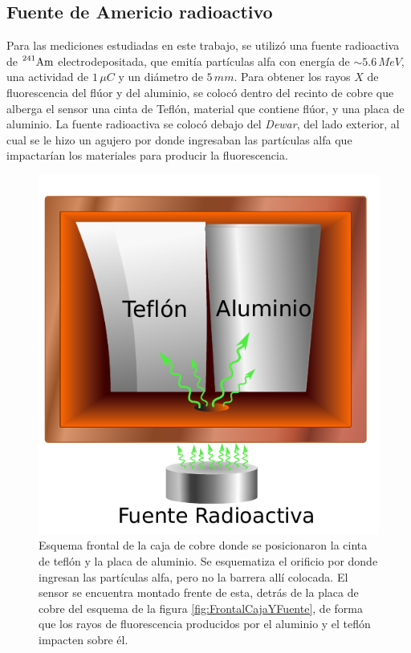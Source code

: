 \subsection{Fuente de Americio radioactivo}
\noindent Para las mediciones estudiadas en este trabajo, se utilizó una fuente radioactiva de $\prescript{241}{}{\mbox{Am}}$ electrodepositada, que emitía partículas alfa con energía de $\sim 5.6\,\si{MeV}$, una actividad de $1\,\si{\mu C}$ y un diámetro de $5\,\si{mm}$. Para obtener los rayos $X$ de fluorescencia del flúor y del aluminio, se colocó dentro del recinto de cobre que alberga el sensor una cinta de Teflón, material que contiene flúor, y una placa de aluminio. La fuente radioactiva se colocó debajo del \textit{Dewar}, del lado exterior, al cual se le hizo un agujero por donde ingresaban las partículas alfa que impactarían los materiales para producir la fluorescencia.
\begin{figure}%
    \centering
    \includegraphics[scale=0.7]{Figs/CajaSensor.pdf}
    \caption{\footnotesize{Esquema frontal de la caja de cobre donde se posicionaron la cinta de teflón y la placa de aluminio. Se esquematiza el orificio por donde ingresan las partículas alfa, pero no la barrera allí colocada. El sensor se encuentra montado frente de esta, detrás de la placa de cobre del esquema de la figura \ref{fig:FrontalCajaYFuente}, de forma que los rayos de fluorescencia producidos por el aluminio y el teflón impacten sobre él.}}
    \label{fig:FrontalAlYF}
\end{figure}
